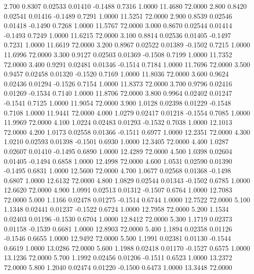    2.700   0.8307   0.02533   0.01410  -0.1488   0.7316   1.0000  11.4680  72.0000
   2.800   0.8420   0.02541   0.01416  -0.1489   0.7291   1.0000  11.5251  72.0000
   2.900   0.8539   0.02546   0.01418  -0.1490   0.7268   1.0000  11.5767  72.0000
   3.000   0.8670   0.02544   0.01414  -0.1493   0.7249   1.0000  11.6215  72.0000
   3.100   0.8814   0.02536   0.01405  -0.1497   0.7231   1.0000  11.6619  72.0000
   3.200   0.8967   0.02522   0.01389  -0.1502   0.7215   1.0000  11.6996  72.0000
   3.300   0.9127   0.02503   0.01369  -0.1508   0.7199   1.0000  11.7352  72.0000
   3.400   0.9291   0.02481   0.01346  -0.1514   0.7184   1.0000  11.7696  72.0000
   3.500   0.9457   0.02458   0.01320  -0.1520   0.7169   1.0000  11.8036  72.0000
   3.600   0.9624   0.02436   0.01294  -0.1526   0.7154   1.0000  11.8373  72.0000
   3.700   0.9796   0.02416   0.01269  -0.1534   0.7140   1.0000  11.8706  72.0000
   3.800   0.9964   0.02402   0.01247  -0.1541   0.7125   1.0000  11.9054  72.0000
   3.900   1.0128   0.02398   0.01229  -0.1548   0.7108   1.0000  11.9441  72.0000
   4.000   1.0279   0.02417   0.01218  -0.1554   0.7085   1.0000  11.9969  72.0000
   4.100   1.0224   0.02483   0.01293  -0.1532   0.7038   1.0000  12.1013  72.0000
   4.200   1.0173   0.02558   0.01366  -0.1511   0.6977   1.0000  12.2351  72.0000
   4.300   1.0210   0.02593   0.01398  -0.1501   0.6930   1.0000  12.3405  72.0000
   4.400   1.0287   0.02607   0.01410  -0.1495   0.6890   1.0000  12.4289  72.0000
   4.500   1.0398   0.02604   0.01405  -0.1494   0.6858   1.0000  12.4998  72.0000
   4.600   1.0531   0.02590   0.01390  -0.1495   0.6831   1.0000  12.5600  72.0000
   4.700   1.0677   0.02568   0.01368  -0.1498   0.6807   1.0000  12.6132  72.0000
   4.800   1.0829   0.02544   0.01343  -0.1502   0.6785   1.0000  12.6620  72.0000
   4.900   1.0991   0.02513   0.01312  -0.1507   0.6764   1.0000  12.7083  72.0000
   5.000   1.1166   0.02478   0.01275  -0.1514   0.6744   1.0000  12.7522  72.0000
   5.100   1.1348   0.02441   0.01237  -0.1522   0.6724   1.0000  12.7958  72.0000
   5.200   1.1534   0.02403   0.01196  -0.1530   0.6704   1.0000  12.8412  72.0000
   5.300   1.1719   0.02373   0.01158  -0.1539   0.6681   1.0000  12.8903  72.0000
   5.400   1.1894   0.02358   0.01126  -0.1546   0.6655   1.0000  12.9492  72.0000
   5.500   1.1991   0.02381   0.01130  -0.1544   0.6619   1.0000  13.0286  72.0000
   5.600   1.1988   0.02418   0.01170  -0.1527   0.6575   1.0000  13.1236  72.0000
   5.700   1.1992   0.02456   0.01206  -0.1511   0.6523   1.0000  13.2372  72.0000
   5.800   1.2040   0.02474   0.01220  -0.1500   0.6473   1.0000  13.3448  72.0000
